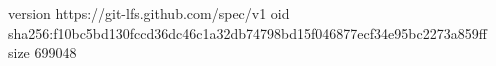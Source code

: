 version https://git-lfs.github.com/spec/v1
oid sha256:f10bc5bd130fccd36dc46c1a32db74798bd15f046877ecf34e95bc2273a859ff
size 699048

